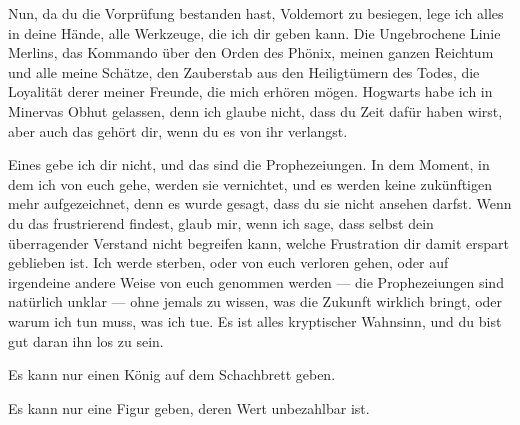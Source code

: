 \begin{writtenNote}
Nun, da du die Vorprüfung bestanden hast, Voldemort zu besiegen, lege ich alles in deine Hände, alle Werkzeuge, die ich dir geben kann. Die Ungebrochene Linie Merlins, das Kommando über den Orden des Phönix, meinen ganzen Reichtum und alle meine Schätze, den Zauberstab aus den Heiligtümern des Todes, die Loyalität derer meiner Freunde, die mich erhören mögen. Hogwarts habe ich in Minervas Obhut gelassen, denn ich glaube nicht, dass du Zeit dafür haben wirst, aber auch das gehört dir, wenn du es von ihr verlangst.

Eines gebe ich dir nicht, und das sind die Prophezeiungen. In dem Moment, in dem ich von euch gehe, werden sie vernichtet, und es werden keine zukünftigen mehr aufgezeichnet, denn es wurde gesagt, dass du sie nicht ansehen darfst. Wenn du das frustrierend findest, glaub mir, wenn ich sage, dass selbst dein überragender Verstand nicht begreifen kann, welche Frustration dir damit erspart geblieben ist. Ich werde sterben, oder von euch verloren gehen, oder auf irgendeine andere Weise von euch genommen werden — die Prophezeiungen sind natürlich unklar — ohne jemals zu wissen, was die Zukunft wirklich bringt, oder warum ich tun muss, was ich tue. Es ist alles kryptischer Wahnsinn, und du bist gut daran ihn los zu sein.

Es kann nur einen König auf dem Schachbrett geben.

Es kann nur eine Figur geben, deren Wert unbezahlbar ist.


\end{writtenNote}
